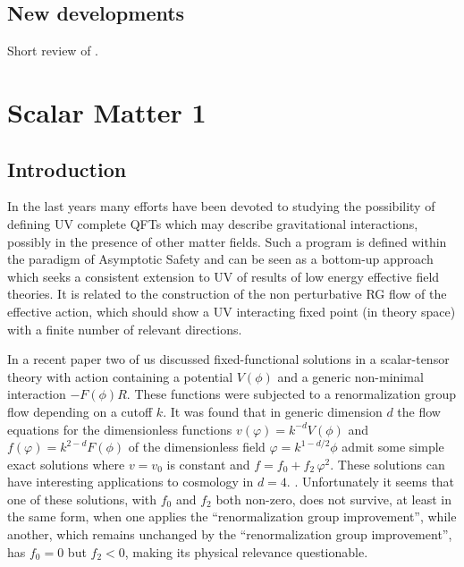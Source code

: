 \documentclass[11pt]{book} %
\numberwithin{equation}{chapter}
\begin{document}
\section{New developments}

Short review of \cite{Percacci:2016arh, Morris:2016spn}.




\chapter{Scalar Matter 1}

\section{Introduction}

In the last years many efforts have been devoted to studying the possibility of defining UV complete QFTs
which may describe gravitational interactions,
possibly in the presence of other matter fields.
Such a program is defined within the paradigm of Asymptotic Safety \cite{Weinberg:1980gg}
and can be seen as a bottom-up approach which seeks a consistent extension
to UV of results of low energy effective field theories.
It is related to the construction of the non perturbative RG flow of the effective action,
which should show a UV interacting fixed point (in theory space)
with a finite number of relevant directions.

In a recent paper \cite{Percacci:2015wwa} two of us discussed
fixed-functional solutions
in a scalar-tensor theory with action containing a potential $V(\phi)$
and a generic non-minimal interaction $-F(\phi)R$.
These functions were subjected to a renormalization group flow
depending on a cutoff $k$.
It was found that in generic dimension $d$ the flow equations for the dimensionless
functions $v(\varphi)=k^{-d}V(\phi)$ and $f(\varphi)=k^{2-d}F(\phi)$
of the dimensionless field $\varphi=k^{1-d/2}\phi$
admit some simple exact solutions where $v=v_0$ is constant and
$f=f_0 + f_2 \, \varphi^2$.
These solutions can have interesting applications to cosmology in $d=4$.
\cite{Henz:2013oxa}.
Unfortunately it seems that one of these solutions,
with $f_0$ and $f_2$ both non-zero, does not survive,
at least in the same form, when one applies the
``renormalization group improvement'',
while another, which remains unchanged by the
``renormalization group improvement'',
has $f_0=0$ but $f_2<0$, making its physical relevance questionable.
\end{document}

